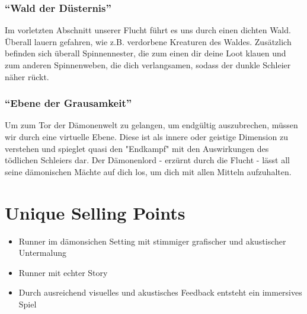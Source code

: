 \documentclass{article}
\begin{document}
\subsubsection{“Wald der Düsternis”}
Im vorletzten Abschnitt unserer Flucht führt es uns durch einen dichten Wald. Überall lauern
gefahren, wie z.B. verdorbene Kreaturen des Waldes. Zusätzlich befinden sich überall
Spinnennester, die zum einen dir deine Loot klauen und zum anderen Spinnenweben, die dich
verlangsamen, sodass der dunkle Schleier näher rückt. \newline
\subsubsection{“Ebene der Grausamkeit”}
Um zum Tor der Dämonenwelt zu gelangen, um endgültig auszubrechen, müssen wir durch
eine virtuelle Ebene. Diese ist als innere oder geistige Dimension zu verstehen und spieglet quasi den "Endkampf" mit den Auswirkungen des tödlichen Schleiers dar.
Der Dämonenlord - erzürnt durch die Flucht - lässt all seine dämonischen Mächte auf dich los, um dich mit allen Mitteln aufzuhalten.

\vspace{1cm}	
\section{Unique Selling Points}
\begin{itemize}
	\item{Runner im dämonsichen Setting mit stimmiger grafischer und akustischer Untermalung}
	\item{Runner mit echter Story}
	\item{Durch ausreichend visuelles und akustisches Feedback entsteht ein immersives Spiel}
\end{itemize}

	
\end{document}
